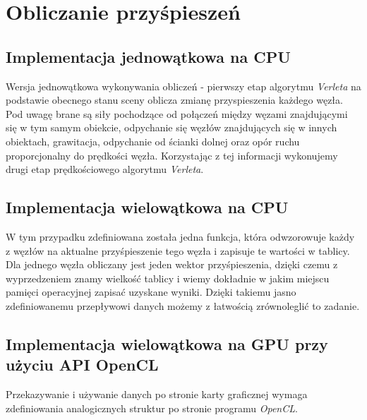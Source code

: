 \documentclass[12pt, letterpaper]{report}
\begin{document}

    \section{Obliczanie przyśpieszeń}

    \subsection{Implementacja jednowątkowa na CPU}
    
    Wersja jednowątkowa wykonywania obliczeń - pierwszy etap algorytmu \emph{Verleta} na podstawie 
    obecnego stanu sceny oblicza zmianę przyspieszenia każdego węzła. 
    Pod uwagę brane są siły pochodzące od połączeń między węzami znajdującymi 
    się w tym samym obiekcie, odpychanie się węzłów znajdujących się w innych obiektach, 
    grawitacja, odpychanie od ścianki dolnej oraz opór ruchu proporcjonalny do prędkości węzła.
    Korzystając z tej informacji wykonujemy drugi etap prędkościowego algorytmu \emph{Verleta}.

    \clearpage
    \subsection{Implementacja wielowątkowa na CPU}
    
    W tym przypadku zdefiniowana została jedna funkcja, która odwzorowuje każdy z 
    węzłów na aktualne przyśpieszenie tego węzła i zapisuje te wartości w tablicy.
    Dla jednego węzła obliczany jest jeden wektor przyśpieszenia, dzięki czemu z wyprzedzeniem
    znamy wielkość tablicy i wiemy dokładnie w 
    jakim miejscu pamięci operacyjnej zapisać uzyskane wyniki.
    Dzięki takiemu jasno zdefiniowanemu przepływowi danych możemy z łatwością zrównoleglić to zadanie.

    \clearpage
    \subsection{Implementacja wielowątkowa na GPU przy użyciu API OpenCL}
    
    Przekazywanie i używanie danych po stronie karty graficznej wymaga zdefiniowania analogicznych
    struktur po stronie programu \emph{OpenCL}.
\end{document}
